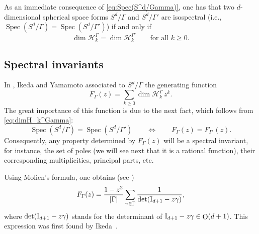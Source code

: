 \documentclass[12pt,a4paper,final]{amsart}
\theoremstyle{plain}
\theoremstyle{definition}
\theoremstyle{remark}
\numberwithin{equation}{section}
\DeclareMathOperator{\Ot}{O}
\newcommand{\Id}{\textup{I}}
\DeclareMathOperator{\Spec}{Spec}
\begin{document}
As an immediate consequence of \eqref{eq:Spec(S^d/Gamma)}, one has that two $d$-dimensional spherical space forms $S^{d}/\Gamma$ and $S^{d}/\Gamma'$ are isospectral (i.e., $\Spec(S^d/\Gamma)=\Spec(S^d/\Gamma')$) if and only if 
\begin{equation}\label{eq:dimH_k^Gamma}
\dim \mathcal H_k^{\Gamma} = \dim \mathcal H_k^{\Gamma'}
\qquad\text{for all $k\geq0$}. 
\end{equation}








\subsection{Spectral invariants}

In \cite{IkedaYamamoto79}, Ikeda and Yamamoto associated to $S^d/\Gamma$ the generating function
\begin{equation}
F_{\Gamma}(z)=\sum_{k\geq0} \dim\mathcal H_k^\Gamma\, z^k. 
\end{equation}
The great importance of this function is due to the next fact, which follows from
\eqref{eq:dimH_k^Gamma}:
\begin{equation}
\Spec(S^d/\Gamma)=\Spec(S^d/\Gamma')
\qquad\Longleftrightarrow\qquad F_{\Gamma}(z)=F_{\Gamma'}(z)
. 
\end{equation}
Consequently, any property determined by $F_{\Gamma}(z)$ will be a spectral invariant, for instance, the set of poles (we will see next that it is a rational function), their corresponding multiplicities, principal parts, etc.  



Using Molien's formula, one obtains (see \cite[(2.4)]{Wolf01})
\begin{equation}\label{eq:Molien}
F_{\Gamma}(z)=\frac{1-z^2}{|\Gamma|} \sum_{\gamma\in\Gamma} \frac{1}{\det(\Id_{d+1}-z\gamma)},
\end{equation}
where $\det(\Id_{d+1}-z\gamma)$ stands for the determinant of $\Id_{d+1}-z\gamma\in\Ot(d+1)$.
This expression was first found by Ikeda~\cite[Thm.~2.2]{Ikeda80_3-dimI}.
\end{document}
